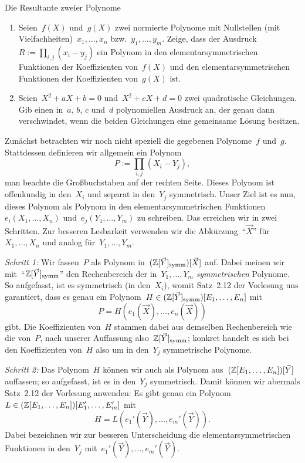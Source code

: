 \documentclass{algblatt}
\begin{document}
\begin{aufgabe}{Die Resultante zweier Polynome}
\begin{enumerate}
\item Seien~$f(X)$ und~$g(X)$ zwei normierte Polynome mit Nullstellen (mit
Vielfachheiten)~$x_1,\ldots,x_n$ bzw.~$y_1,\ldots,y_m$. Zeige, dass der
Ausdruck~$R := \prod_{i,j} (x_i - y_j)$ ein Polynom in den
elementarsymmetrischen Funktionen der Koeffizienten von~$f(X)$ und den
elementarsymmetrischen Funktionen der Koeffizienten von~$g(X)$ ist.
\item Seien~$X^2 + aX + b = 0$ und~$X^2 + cX + d = 0$ zwei quadratische
Gleichungen. Gib einen in~$a$, $b$, $c$ und~$d$ polynomiellen Ausdruck an, der
genau dann verschwindet, wenn die beiden Gleichungen eine gemeinsame Lösung
besitzen.
\end{enumerate}

\begin{loesungE}
\item Zunächst betrachten wir noch nicht speziell die gegebenen
Polynome~$f$ und~$g$. Stattdessen definieren wir allgemein ein Polynom
\[ P := \prod_{i,j} (X_i - Y_j), \]
man beachte die Großbuchstaben auf der rechten Seite. Dieses Polynom ist
offenkundig in den~$X_i$ und separat in den~$Y_j$ symmetrisch. Unser Ziel ist
es nun, dieses Polynom als Polynom in den elementarsymmetrischen
Funktionen~$e_i(X_1,\ldots,X_n)$ und~$e_j(Y_1,\ldots,Y_m)$ zu schreiben. Das
erreichen wir in zwei Schritten. Zur besseren Lesbarkeit verwenden wir die
Abkürzung~"`$\vec X$"' für~$X_1,\ldots,X_n$ und analog für~$Y_1,\ldots,Y_m$.

\newcommand{\symm}{\mathrm{symm}}%
\emph{Schritt 1:} Wir fassen~$P$ als Polynom
in~$(\ZZ[\vec Y]_\symm)[\vec X]$ auf. Dabei meinen wir mit~"`$\ZZ[\vec
Y]_\symm$"' den Rechenbereich der in~$Y_1,\ldots,Y_m$ \emph{symmetrischen}
Polynome. So aufgefasst, ist es symmetrisch (in den~$X_i$), womit Satz~2.12 der
Vorlesung uns garantiert, dass es genau ein Polynom~$H \in (\ZZ[\vec
Y]_\symm)[E_1,\ldots,E_n]$ mit
\[ P = H(e_1(\vec X), \ldots, e_n(\vec X)) \]
gibt. Die Koeffizienten von~$H$ stammen dabei aus demselben Rechenbereich wie
die von~$P$, nach unserer Auffassung also~$\ZZ[\vec Y]_\symm$; konkret handelt
es sich bei den Koeffizienten von~$H$ also um in den~$Y_j$ symmetrische
Polynome.

\emph{Schritt 2:} Das Polynom~$H$ können wir auch als Polynom
aus~$(\mathbb{Z}[E_1,\ldots,E_n])[\vec Y]$ auffassen; so aufgefasst, ist es in
den~$Y_j$ symmetrisch. Damit können wir abermals Satz~2.12 der Vorlesung
anwenden: Es gibt genau ein Polynom~$L \in
(\mathbb{Z}[E_1,\ldots,E_n])[E_1',\ldots,E_m']$ mit
\[ H = L(e_1'(\vec Y), \ldots, e_m'(\vec Y)). \]
Dabei bezeichnen wir zur besseren Unterscheidung die elementarsymmetrischen
Funktionen in den~$Y_j$ mit~$e_1'(\vec Y), \ldots, e_m'(\vec Y)$.


\end{loesungE}
\end{aufgabe}
\end{document}
